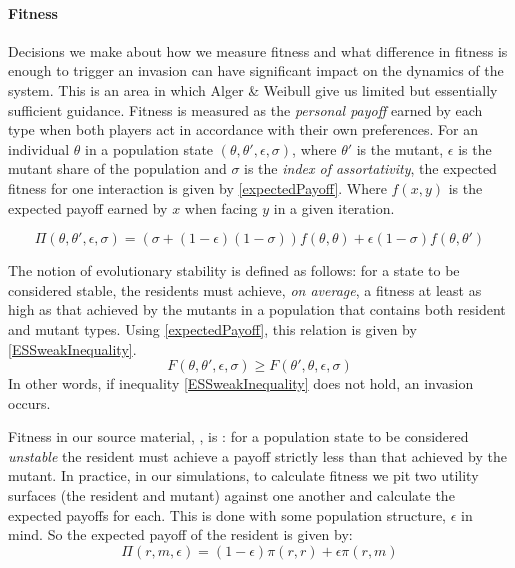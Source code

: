 \documentclass[11pt]{book}
\newcommand*{\np}{\par\noindent\newline}
\begin{document}
\paragraph{Fitness}
\np Decisions we make about how we measure fitness and what difference in fitness is enough to trigger an invasion can have significant impact on the dynamics of the system.
This is an area in which Alger \& Weibull give us limited but essentially sufficient guidance.
Fitness is measured as the \textit{personal payoff} earned by each type when both players act in accordance with their own preferences.
For an individual $\theta$ in a population state $(\theta, \theta', \epsilon,\sigma)$,
where $\theta'$ is the mutant, $\epsilon$ is the mutant share of the population and $\sigma$ is the \textit{index of assortativity}, the expected fitness for one interaction is given by \ref{expectedPayoff}.
Where $f(x, y)$ is the expected payoff earned by $x$ when facing $y$ in a given iteration.

\begin{equation}
	\label{expectedPayoff}
	\Pi(\theta, \theta', \epsilon, \sigma) = (\sigma +(1-\epsilon)(1-\sigma))f(\theta, \theta) + \epsilon(1-\sigma)f(\theta, \theta')
\end{equation}

\np The notion of evolutionary stability is defined as follows: for a state to be considered stable, the residents must achieve, \textit{on average}, a fitness at least as high as that achieved by the mutants in a population that contains both resident and mutant types.
Using \ref{expectedPayoff}, this relation is given by \ref{ESSweakInequality}.
\begin{equation}
	\label{ESSweakInequality}
	F(\theta, \theta', \epsilon, \sigma) \geq F(\theta', \theta, \epsilon, \sigma)
\end{equation}
In other words, if inequality \ref{ESSweakInequality} does not hold, an invasion occurs.

Fitness in our source material, \citet{alger_generalization_2012}, is : for a population state to be considered \textit{unstable} the resident must achieve a payoff strictly less than that achieved by the mutant.
In practice, in our simulations, to calculate fitness we pit two utility surfaces (the resident and mutant) against one another and calculate the expected payoffs for each.
This is done with some population structure, $\epsilon$ in mind. So the expected payoff of the resident is given by:
\begin{equation}
\Pi(r, m, \epsilon) = (1-\epsilon)\pi(r,r) + \epsilon\pi(r,m)
\end{equation}
\end{document}
